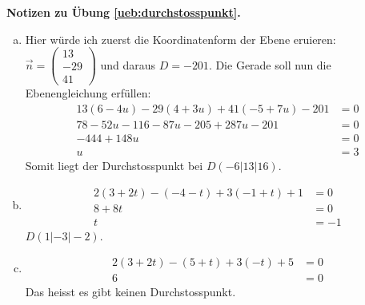 \documentclass[%
11pt,%
twoside,%
titlepage,%
german,%
headsepline%
]{scrartcl}
\theoremstyle{definition}
\theoremstyle{plain}
\newcommand{\concatueb}[1]{ueb:#1}%
\newcommand{\concatlsg}[1]{lsg:#1}%
\newenvironment{lsg}[1]{%
    \par\noindent\textbf{Notizen zu Übung \ref{\concatueb{#1}}.}%
    \label{\concatlsg{#1}}
}{%
    \par%
}
\begin{document}
\begin{lsg}{durchstosspunkt}
\begin{enumerate}[a)]
    \item Hier würde ich zuerst die Koordinatenform der Ebene eruieren: $\vec{n}=\begin{pmatrix}
        13\\-29\\41
    \end{pmatrix}$ und daraus $D=-201$. Die Gerade soll nun die Ebenengleichung erfüllen:
    \begin{align*}
        13(6-4u)-29(4+3u)+41(-5+7u)-201 &= 0\\
        78-52u-116-87u-205+287u-201 &= 0\\
        -444+148u &= 0\\
        u &= 3
    \end{align*}
    Somit liegt der Durchstosspunkt bei $D(-6|13|16)$.

    \item \begin{align*}
        2(3+2t)-(-4-t)+3(-1+t)+1 &= 0\\
        8+8t &= 0\\
        t &= -1
    \end{align*}
    $D(1|-3|-2)$.

    \item \begin{align*}
        2(3+2t)-(5+t)+3(-t)+5 &= 0\\
        6 &= 0
    \end{align*}
    Das heisst es gibt keinen Durchstosspunkt.
\end{enumerate}
\end{lsg}
\end{document}
